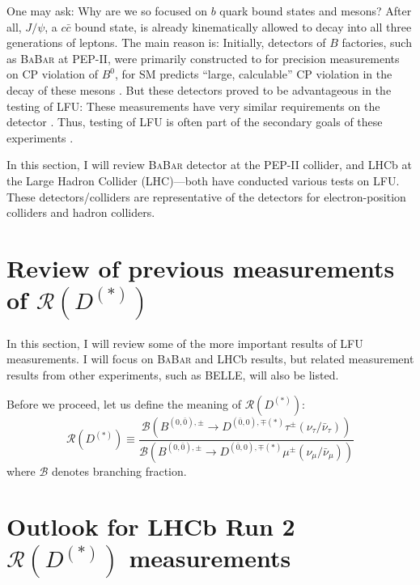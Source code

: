 \documentclass[10pt]{article}
\newcommand{\PRLrule}{
    \bigskip
    \noindent\makebox[\linewidth]{
        \resizebox{0.3333\linewidth}{1pt}{$\blacklozenge$}
    }
    \bigskip
}
\def\BaBar/{\textsc{BaBar}}
\def\RDDst/{\ensuremath{\mathcal{R}(D^{(*)})}}
\begin{document}
One may ask: Why are we so focused on $b$ quark bound states and mesons?
After all, $J/\psi$, a $c\bar{c}$ bound state, is already kinematically allowed
to decay into all three generations of leptons.
The main reason is:
Initially, detectors of $B$ factories, such as \BaBar/ at PEP-II, were
primarily constructed to for precision measurements on CP violation of $B^0$,
for SM predicts ``large, calculable'' CP violation in the decay of these mesons
\cite{Luth:1994}.
But these detectors proved to be advantageous in the testing of LFU:
These measurements have very similar requirements on the
detector \cite{Boutigny:1995ib}.
Thus, testing of LFU is often part of the secondary goals of these
experiments \cite{Luth:1994}.

In this section, I will review \BaBar/ detector at the PEP-II collider, and LHCb
at the Large Hadron Collider (LHC)---both have conducted various tests on LFU.
These detectors/colliders are representative of the detectors for
electron-position colliders and hadron colliders.





\section{Review of previous measurements of \RDDst/}
In this section, I will review some of the more important results of LFU
measurements.
I will focus on \BaBar/ and LHCb results, but related measurement results from
other experiments, such as BELLE, will also be listed.

Before we proceed, let us define the meaning of \RDDst/:
\begin{equation*}
    \RDDst/ \equiv \frac{
        \mathcal{B}\left(
        B^{(0,\bar{0}),\pm} \longrightarrow D^{(\bar{0},0),\mp(*)} \tau^{\pm}
            \left(\nu_{\tau}/\bar{\nu}_{\tau}\right)\right)
        }{
        \mathcal{B}\left(
        B^{(0,\bar{0}),\pm} \longrightarrow D^{(\bar{0},0),\mp(*)} \mu^{\pm}
            \left(\nu_{\mu}/\bar{\nu}_{\mu}\right)\right)
        }
\end{equation*}
where $\mathcal{B}$ denotes branching fraction.






\section{Outlook for LHCb Run 2 \RDDst/ measurements}



\PRLrule
\printbibliography
\end{document}
